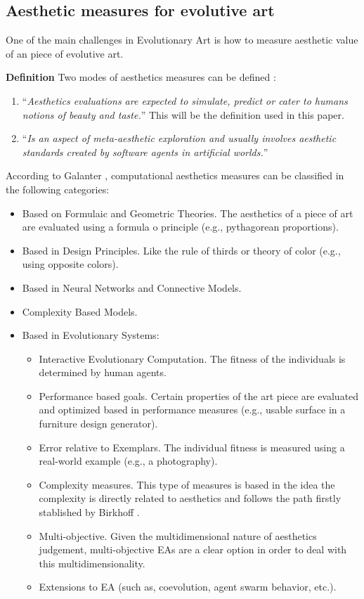 \documentclass[conference]{IEEEtran}
\begin{document}
\subsection{Aesthetic measures for evolutive art}\label{evo_art:aesth}
One of the main challenges in Evolutionary Art is how to measure aesthetic value of an piece of evolutive art.

{\bf Definition} Two modes of aesthetics measures can be defined \cite{galanter2012computational}: 
\begin{enumerate}
\item ``{\em Aesthetics evaluations are expected to simulate, predict or cater to humans notions of beauty and taste.}'' This will be the definition used in this paper. 
\item ``{\em Is an aspect of meta-aesthetic exploration and usually involves aesthetic standards created by software agents in artificial worlds.}''
\end{enumerate}

According to Galanter \cite{galanter2012computational}, computational aesthetics measures can be classified in the following categories:
\begin{itemize}
	\item Based on Formulaic and Geometric Theories. The aesthetics of a piece of art are evaluated using a formula o principle (e.g., pythagorean proportions).
	\item Based in Design Principles. Like the rule of thirds or theory of color (e.g., using opposite colors).
	\item Based in Neural Networks and Connective Models. 
	\item Complexity Based Models. 
	\item Based in Evolutionary Systems:
		\begin{itemize}
			\item Interactive Evolutionary Computation. The fitness of the individuals is determined by human agents.
			\item Performance based goals. Certain properties of the art piece are evaluated and optimized based in performance measures (e.g., usable surface in a furniture design generator).  
			\item Error relative to Exemplars. The individual fitness is measured using a real-world example (e.g., a photography).
			\item Complexity measures. This type of measures is based in the idea the complexity is directly related to aesthetics and follows the path firstly stablished by Birkhoff \cite{birkhoff2003aesthetic}.
			\item Multi-objective. Given the multidimensional nature of aesthetics judgement, multi-objective EAs are a clear option in order to deal with this multidimensionality.
			\item Extensions to EA (such as, coevolution, agent swarm behavior, etc.).
		\end{itemize}
\end{itemize}
\end{document}
